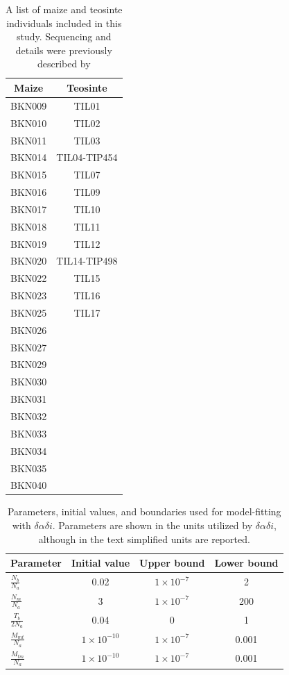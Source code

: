 \documentclass[12pt,a4paper]{article}
\begin{document}
\begin{table}[h]  
  \begin{center}
  \begin{tabular}{c|c}
    \bf Maize & \bf Teosinte \\ \hline \hline
    BKN009 &  TIL01 \\
    BKN010 & TIL02 \\
    BKN011 & TIL03 \\
    BKN014 & TIL04-TIP454 \\
    BKN015 & TIL07 \\
    BKN016 & TIL09 \\
    BKN017 & TIL10 \\
    BKN018 & TIL11 \\
    BKN019 & TIL12 \\
    BKN020 & TIL14-TIP498 \\
    BKN022 & TIL15 \\
    BKN023 & TIL16 \\
    BKN025 & TIL17 \\
    BKN026 & \\
    BKN027 & \\
    BKN029 & \\
    BKN030 & \\
    BKN031 & \\
    BKN032 & \\
    BKN033 & \\
    BKN034 & \\
    BKN035 & \\
    BKN040 & \\ \hline
  \end{tabular}
  \end{center}
  \caption{A list of maize and teosinte individuals included in this study. Sequencing and details were previously described by \cite{chia2012}   } \label{sTab:list}
\end{table}
\clearpage


\begin{table}
  \begin{center}
  \def\arraystretch{2}
  \begin{tabular}{l|c|c|c}
    \bf Parameter & \bf Initial value & \bf Upper bound & \bf Lower bound\\ \hline 
    $\frac{N_b}{N_a}$ & 0.02 & $1\times10^{-7}$ & 2 \\ 
    $\frac{N_{m}}{N_a}$ & 3 & $1\times10^{-7}$ & 200 \\
    $\frac{T_b}{2N_a}$ & 0.04 & 0  & 1 \\ 
    $\frac{M_{mt}}{N_a}$ & $1\times10^{-10}$ & $1\times10^{-7}$ & 0.001 \\
    $\frac{M_{tm}}{N_a}$ & $1\times10^{-10}$ & $1\times10^{-7}$ & 0.001 \\
  \end{tabular}
  \def\arraystretch{1} %
  \end{center}
    \caption{ Parameters, initial values, and boundaries used for model-fitting with $\delta\alpha\delta{i}$. Parameters are shown in the units utilized by $\delta\alpha\delta{i}$, although in the text simplified units are reported.    }\label{sTab:dadi}
\end{table}
\end{document}
